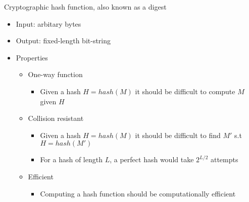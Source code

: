 \documentclass{easyclass}
\begin{document}
    \begin{theo}{}
        \begin{definition}{}
            Cryptographic hash function, also known as a digest
        \end{definition}
        \begin{itemize}
            \item Input: arbitary bytes
            \item Output: fixed-length bit-string
        \end{itemize}

        \begin{itemize}
            \item Properties
            \begin{itemize}
                \item One-way function
                \begin{itemize}
                    \item Given a hash $H = hash(M)$ it should be difficult to compute $M$ given $H$
                \end{itemize}
                \item Collision resistant
                \begin{itemize}
                    \item Given a hash $H = hash(M)$ it should be difficult to find $M'$ s.t $H = hash(M')$
                    \item For a hash of length $L$, a perfect hash would take $2^{L/2}$ attempts
                \end{itemize}
                \item Efficient
                \begin{itemize}
                    \item Computing a hash function should be computationally efficient
                \end{itemize}
            \end{itemize}
        \end{itemize}
        
    \end{theo}
\end{document}
